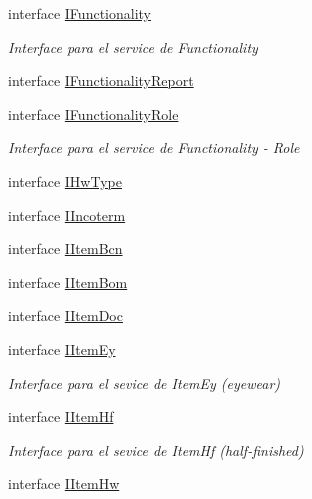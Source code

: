 \begin{DoxyCompactItemize}
\item 
interface \mbox{\hyperlink{interface_h_k_supply_1_1_services_1_1_interfaces_1_1_i_functionality}{I\+Functionality}}
\begin{DoxyCompactList}\small\item\em Interface para el service de Functionality \end{DoxyCompactList}\item 
interface \mbox{\hyperlink{interface_h_k_supply_1_1_services_1_1_interfaces_1_1_i_functionality_report}{I\+Functionality\+Report}}
\item 
interface \mbox{\hyperlink{interface_h_k_supply_1_1_services_1_1_interfaces_1_1_i_functionality_role}{I\+Functionality\+Role}}
\begin{DoxyCompactList}\small\item\em Interface para el service de Functionality -\/ Role \end{DoxyCompactList}\item 
interface \mbox{\hyperlink{interface_h_k_supply_1_1_services_1_1_interfaces_1_1_i_hw_type}{I\+Hw\+Type}}
\item 
interface \mbox{\hyperlink{interface_h_k_supply_1_1_services_1_1_interfaces_1_1_i_incoterm}{I\+Incoterm}}
\item 
interface \mbox{\hyperlink{interface_h_k_supply_1_1_services_1_1_interfaces_1_1_i_item_bcn}{I\+Item\+Bcn}}
\item 
interface \mbox{\hyperlink{interface_h_k_supply_1_1_services_1_1_interfaces_1_1_i_item_bom}{I\+Item\+Bom}}
\item 
interface \mbox{\hyperlink{interface_h_k_supply_1_1_services_1_1_interfaces_1_1_i_item_doc}{I\+Item\+Doc}}
\item 
interface \mbox{\hyperlink{interface_h_k_supply_1_1_services_1_1_interfaces_1_1_i_item_ey}{I\+Item\+Ey}}
\begin{DoxyCompactList}\small\item\em Interface para el sevice de Item\+Ey (eyewear) \end{DoxyCompactList}\item 
interface \mbox{\hyperlink{interface_h_k_supply_1_1_services_1_1_interfaces_1_1_i_item_hf}{I\+Item\+Hf}}
\begin{DoxyCompactList}\small\item\em Interface para el sevice de Item\+Hf (half-\/finished) \end{DoxyCompactList}\item 
interface \mbox{\hyperlink{interface_h_k_supply_1_1_services_1_1_interfaces_1_1_i_item_hw}{I\+Item\+Hw}}

\end{DoxyCompactItemize}
